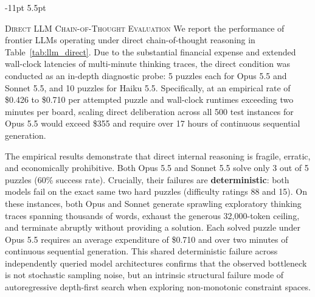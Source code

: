 \documentclass{article} %
\makeatletter
\renewcommand\subsection{\@startsection{subsection}{2}{\z@}%
  {-11pt \@plus -3pt \@minus -2pt}%
  {5.5pt \@plus 2pt}%
  {\normalfont\fontsize{10}{12}\selectfont\scshape\raggedright}}
\makeatother
\begin{document}
\subsection{\textsc{Direct LLM Chain-of-Thought Evaluation}}
\label{sec:exp_llm_direct}
We report the performance of frontier LLMs operating under direct chain-of-thought reasoning in Table~\ref{tab:llm_direct}. Due to the substantial financial expense and extended wall-clock latencies of multi-minute thinking traces, the direct condition was conducted as an in-depth diagnostic probe: 5 puzzles each for Opus 5.5 and Sonnet 5.5, and 10 puzzles for Haiku 5.5. Specifically, at an empirical rate of \$0.426 to \$0.710 per attempted puzzle and wall-clock runtimes exceeding two minutes per board, scaling direct deliberation across all 500 test instances for Opus 5.5 would exceed \$355 and require over 17 hours of continuous sequential generation.

\begin{table}[t]
\caption{Performance of frontier LLMs solving \textsc{Sudoku-Extreme} directly via adaptive thinking. Context ceiling is capped at 32,000 tokens per puzzle. Confidence intervals denote 95\% Wilson score intervals.}
\label{tab:llm_direct}
\begin{center}
\end{center}
\end{table}

The empirical results demonstrate that direct internal reasoning is fragile, erratic, and economically prohibitive. Both Opus 5.5 and Sonnet 5.5 solve only 3 out of 5 puzzles (60\% success rate). Crucially, their failures are \textbf{deterministic}: both models fail on the exact same two hard puzzles (difficulty ratings 88 and 15). On these instances, both Opus and Sonnet generate sprawling exploratory thinking traces spanning thousands of words, exhaust the generous 32,000-token ceiling, and terminate abruptly without providing a solution. Each solved puzzle under Opus 5.5 requires an average expenditure of \$0.710 and over two minutes of continuous sequential generation. This shared deterministic failure across independently queried model architectures confirms that the observed bottleneck is not stochastic sampling noise, but an intrinsic structural failure mode of autoregressive depth-first search when exploring non-monotonic constraint spaces.
\end{document}
